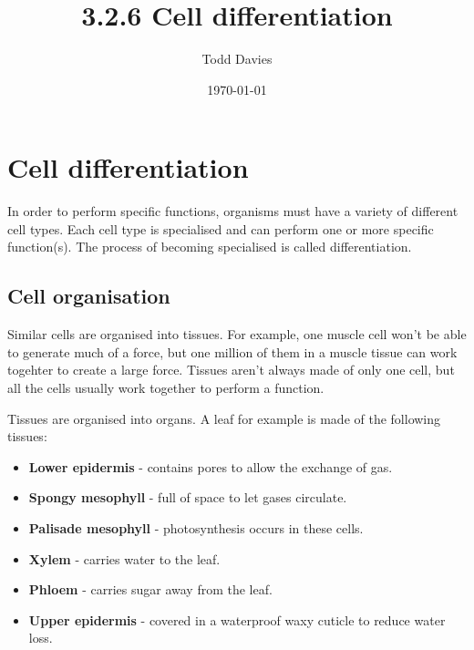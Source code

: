 \documentclass{article}
\author{Todd Davies}
\title{3.2.6 Cell differentiation}
\date{\today}
\begin{document}
\lhead{\today}

\maketitle

\section*{Cell differentiation}
\thispagestyle{empty}

In order to perform specific functions, organisms must have a variety of
different cell types. Each cell type is specialised and can perform one or more
specific function(s). The process of becoming specialised is called
differentiation.

\subsection*{Cell organisation}

Similar cells are organised into tissues. For example, one muscle cell won't be
able to generate much of a force, but one million of them in a muscle tissue can
work togehter to create a large force. Tissues aren't always made of only one
cell, but all the cells usually work together to perform a function.

Tissues are organised into organs. A leaf for example is made of the following
tissues:

\begin{itemize}

	\item {\bf Lower epidermis} - contains pores to allow the exchange of gas.

	\item {\bf Spongy mesophyll} - full of space to let gases circulate.

	\item {\bf Palisade mesophyll} - photosynthesis occurs in these cells.

	\item {\bf Xylem} - carries water to the leaf.

	\item {\bf Phloem} - carries sugar away from the leaf.

	\item {\bf Upper epidermis} - covered in a waterproof waxy cuticle to reduce water loss.

\end{itemize}
\end{document}
